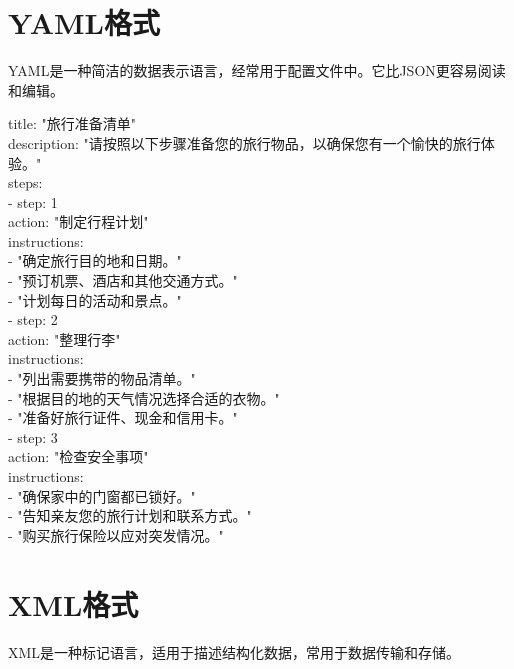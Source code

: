 \documentclass[12pt]{book}
\begin{document}
\section{YAML格式}
YAML是一种简洁的数据表示语言，经常用于配置文件中。它比JSON更容易阅读和编辑。


\begin{tcolorbox}
title: "旅行准备清单"\\
description: "请按照以下步骤准备您的旅行物品，以确保您有一个愉快的旅行体验。"\\
steps:\\
- step: 1\\
action: "制定行程计划"\\
instructions:\\
- "确定旅行目的地和日期。"\\
- "预订机票、酒店和其他交通方式。"\\
- "计划每日的活动和景点。"\\
- step: 2\\
action: "整理行李"\\
instructions:\\
- "列出需要携带的物品清单。"\\
- "根据目的地的天气情况选择合适的衣物。"\\
- "准备好旅行证件、现金和信用卡。"\\
- step: 3\\
action: "检查安全事项"\\
instructions:\\
- "确保家中的门窗都已锁好。"\\
- "告知亲友您的旅行计划和联系方式。"\\
- "购买旅行保险以应对突发情况。"\\

\end{tcolorbox}	

\section{XML格式}
XML是一种标记语言，适用于描述结构化数据，常用于数据传输和存储。
\end{document}
